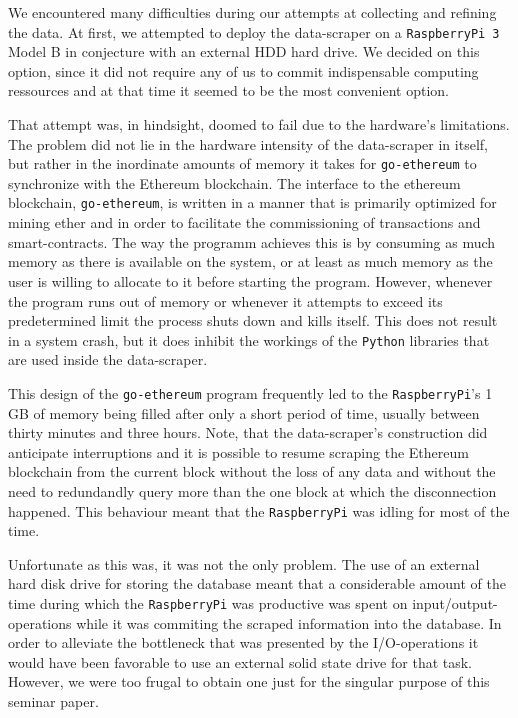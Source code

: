 We encountered many difficulties during our attempts at collecting and refining the data. At first, we attempted to deploy the data-scraper on a \texttt{RaspberryPi 3} Model B in conjecture with an external HDD hard drive. We decided on this option, since it did not require any of us to commit indispensable computing ressources and at that time it seemed to be the most convenient option.

That attempt was, in hindsight, doomed to fail due to the hardware's limitations. The problem did not lie in the hardware intensity of the data-scraper in itself, but rather in the inordinate amounts of memory it takes for \texttt{go-ethereum} to synchronize with the Ethereum blockchain. The interface to the ethereum blockchain, \texttt{go-ethereum}, is written in a manner that is primarily optimized for mining ether and in order to facilitate the commissioning of transactions and smart-contracts. The way the programm achieves this is by consuming as much memory as there is available on the system, or at least as much memory as the user is willing to allocate to it before starting the program. However, whenever the program runs out of memory or whenever it attempts to exceed its predetermined limit the process shuts down and kills itself. This does not result in a system crash, but it does inhibit the workings of the \texttt{Python} libraries that are used inside the data-scraper.

This design of the \texttt{go-ethereum} program frequently led to the \texttt{RaspberryPi}'s 1 GB of memory being filled after only a short period of time, usually between thirty minutes and three hours. Note, that the data-scraper's construction did anticipate interruptions and it is possible to resume scraping the Ethereum blockchain from the current block without the loss of any data and without the need to redundandly query more than the one block at which the disconnection happened. This behaviour meant that the \texttt{RaspberryPi} was idling for most of the time.

Unfortunate as this was, it was not the only problem. The use of an external hard disk drive for storing the database meant that a considerable amount of the time during which the \texttt{RaspberryPi} was productive was spent on input/output-operations while it was commiting the scraped information into the database. In order to alleviate the bottleneck that was presented by the I/O-operations it would have been favorable to use an external solid state drive for that task. However, we were too frugal to obtain one just for the singular purpose of this seminar paper.

